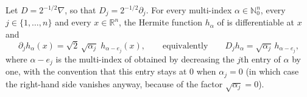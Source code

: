 \begin{lemma}
Let $D = 2^{-1/2}\nabla$, so that $D_j = 2^{-1/2}\partial_j$.  For every
multi-index $\alpha \in \mathbb{N}_0^n$, every $j \in \{1,\ldots,n\}$ and every
$x \in \mathbb{R}^n$, the Hermite function $h_\alpha$ of  is
differentiable at $x$ and
\[
  \partial_j h_\alpha(x) = \sqrt{2}\,\sqrt{\alpha_j}\; h_{\alpha - e_j}(x),
  \qquad\text{equivalently}\qquad
  D_j h_\alpha = \sqrt{\alpha_j}\, h_{\alpha - e_j},
\]
where $\alpha - e_j$ is the multi-index of  obtained by
decreasing the $j$th entry of $\alpha$ by one, with the convention that this entry
stays at $0$ when $\alpha_j = 0$ (in which case the right-hand side vanishes
anyway, because of the factor $\sqrt{\alpha_j} = 0$).
\end{lemma}
